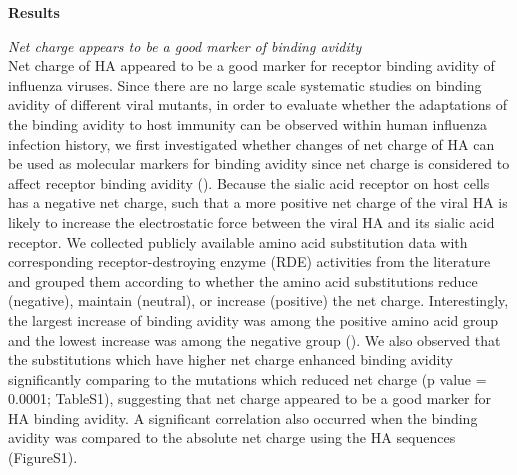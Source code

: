 \documentclass[12pt,a4paper]{article}
\begin{document}
{\bf Results}

{\it  Net charge appears to be a good marker of binding avidity} \\
Net charge of HA appeared to be a good marker for receptor binding avidity of influenza viruses.  Since there are no large scale systematic studies on binding avidity of different viral mutants, in order to evaluate whether the adaptations of the binding avidity to host immunity can be observed within human influenza infection history, we first investigated whether changes of net charge of HA can be used as molecular markers for binding avidity since net charge is considered to affect receptor binding avidity (\cite{Arinaminpathy2010}). Because the sialic acid receptor on host cells has a negative net charge, such that a more positive net charge of the viral HA is likely to increase the electrostatic force between the viral HA and its sialic acid receptor. We collected publicly available amino acid substitution data with corresponding receptor-destroying enzyme (RDE) activities from the literature and grouped them  according to whether the amino acid substitutions reduce (negative), maintain (neutral), or increase (positive) the net charge. Interestingly, the largest increase of binding avidity was among the positive amino acid group and the lowest increase was among the negative group ().  We also observed that the substitutions which have higher net charge enhanced binding avidity significantly comparing to the mutations which reduced net charge (p value = 0.0001; TableS1), suggesting that net charge appeared to be a good marker for HA binding avidity. A significant correlation also occurred when the binding avidity was compared to the absolute net charge using the HA sequences (FigureS1). \\
\end{document}
